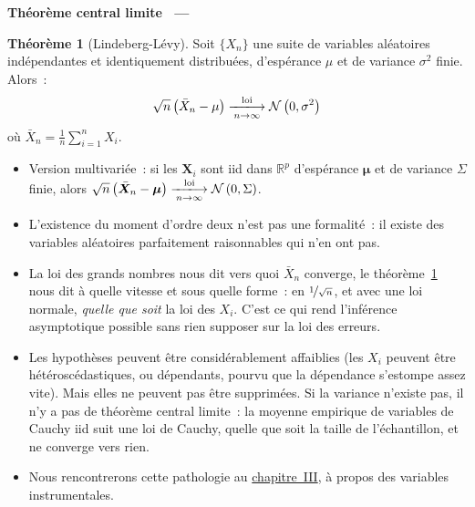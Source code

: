 \documentclass[10pt,a4paper]{article}
\makeatletter
\newcommand{\siteurl}{https://le-mans.adjemian.eu/econometrics}
\newcommand{\chapref}[2]{\href{\siteurl/chapitre-#1.pdf}{chapitre~#2}}
\theoremstyle{definition}
\newtheorem{theorem}{Théorème}
\renewcommand{\newline}{\unskip\par\vspace{1.5pt}}
\newenvironment{frame}[1][]{\par}{\par}
\newcommand{\frameheadrule}{%
  \par\nobreak\vspace{1pt}{\color{ctitle}\hrule height 0.6pt}\nobreak\vspace{4pt}}
\newcommand{\frametitle}[1]{%
  \par\addvspace{8pt plus 2pt}\needspace{6\baselineskip}%
  \noindent\begingroup\color{ctitle}\sffamily\bfseries\large #1\endgroup
  \@ifnextchar\framesubtitle{}{\frameheadrule}}
\newcommand{\framesubtitle}[1]{%
  \begingroup\color{ctitle}\sffamily\normalsize\ --- #1\endgroup\frameheadrule}
\makeatother
\begin{document}
\begin{frame}
  \frametitle{Théorème central limite}

  \begin{theorem}[Lindeberg-Lévy]\label{thm:tcl}
    Soit $\{X_n\}$ une suite de variables aléatoires indépendantes et
    identiquement distribuées, d'espérance $\mu$ et de variance $\sigma^2$
    finie. Alors~:
    \[
      \sqrt{n}\left( \bar X_n - \mu \right) \xlongrightarrow[n\rightarrow\infty]{\text{loi}} \mathcal N\left( 0,\sigma^2 \right)
    \]
    où $\bar X_n = \frac{1}{n}\sum_{i=1}^n X_i$.
  \end{theorem}

  \bigskip

  \begin{itemize}

  \item Version multivariée~: si les $\bm X_i$ sont iid dans $\mathbb R^p$
    d'espérance $\bm\mu$ et de variance $\Sigma$ finie, alors
    $\sqrt{n}\left( \bar{\bm X}_n - \bm\mu \right) \xlongrightarrow[n\rightarrow\infty]{\text{loi}} \mathcal N\left( 0,\Sigma \right)$.\newline

  \item[\dbend] L'existence du moment d'ordre deux n'est pas une formalité~: il
    existe des variables aléatoires parfaitement raisonnables qui n'en ont pas.

  \end{itemize}

\end{frame}


\begin{notes}

  \begin{itemize}

  \item La loi des grands nombres nous dit vers quoi $\bar X_n$ converge, le
    théorème~\ref{thm:tcl} nous dit à quelle vitesse et sous quelle forme~: en
    $\nicefrac{1}{\sqrt n}$, et avec une loi normale, \emph{quelle que soit} la
    loi des $X_i$. C'est ce qui rend l'inférence asymptotique possible sans rien
    supposer sur la loi des erreurs.\newline

  \item Les hypothèses peuvent être considérablement affaiblies (les $X_i$
    peuvent être hétéroscédastiques, ou dépendants, pourvu que la dépendance
    s'estompe assez vite). Mais elles ne peuvent pas être supprimées. Si la
    variance n'existe pas, il n'y a pas de théorème central limite~: la moyenne
    empirique de variables de Cauchy iid suit une loi de Cauchy, quelle que soit
    la taille de l'échantillon, et ne converge vers rien.\newline

  \item Nous rencontrerons cette pathologie au \chapref{3}{III}, à propos des
    variables instrumentales.

  \end{itemize}

\end{notes}
\end{document}
